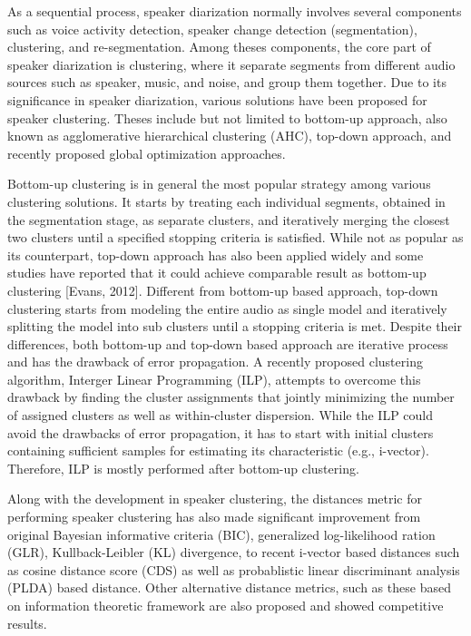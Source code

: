 \documentclass[journal]{IEEEtran}
\begin{document}
As a sequential process, speaker diarization normally involves several components such as voice activity detection, speaker change detection (segmentation), clustering, and re-segmentation. Among theses components, the core part of speaker diarization is clustering, where it separate segments from different audio sources such as speaker, music, and noise, and group them together. Due to its significance in speaker diarization, various solutions have been proposed for speaker clustering. Theses include but not limited to bottom-up approach, also known as agglomerative hierarchical clustering (AHC), top-down approach, and recently proposed global optimization approaches. 

Bottom-up clustering is in general the most popular strategy among various clustering solutions. It starts by treating each individual segments, obtained in the segmentation stage, as separate clusters, and iteratively merging the closest two clusters until a specified stopping criteria is satisfied. While not as popular as its counterpart, top-down approach has also been applied widely and some studies have reported that it could achieve comparable result as bottom-up clustering [Evans, 2012]. Different from bottom-up based approach, top-down clustering starts from modeling the entire audio as single model and iteratively splitting the model into sub clusters until a stopping criteria is met. Despite their differences, both bottom-up and top-down based approach are iterative process and has the drawback of error propagation. A recently proposed clustering algorithm, Interger Linear Programming (ILP), attempts to overcome this drawback by finding the cluster assignments that jointly minimizing the number of assigned clusters as well as within-cluster dispersion. While the ILP could avoid the drawbacks of error propagation, it has to start with initial clusters containing sufficient samples for estimating its characteristic (e.g., i-vector). Therefore, ILP is mostly performed after bottom-up clustering.

Along with the development in speaker clustering, the distances metric for performing speaker clustering has also made significant improvement from original Bayesian informative criteria (BIC), generalized log-likelihood ration (GLR), Kullback-Leibler (KL) divergence, to recent i-vector based distances such as cosine distance score (CDS) as well as probablistic linear discriminant analysis (PLDA) based distance. Other alternative distance metrics, such as these based on information theoretic framework are also proposed and showed competitive results. 
\end{document}
